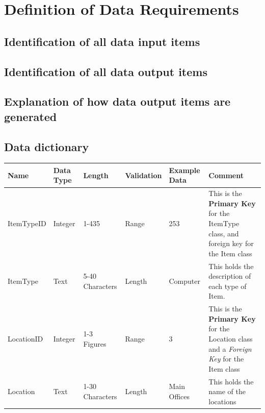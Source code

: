 \section{Definition of Data Requirements}

\subsection{Identification of all data input items}

\subsection{Identification of all data output items}

\subsection{Explanation of how data output items are generated}

\begin{landscape}

    \begin{center}
    \subsection{Data dictionary}
    \end{center}
    
    \begin{center}
        \begin{tabular}{|p{3cm}|p{2cm}|p{3cm}|p{2cm}|p{2cm}|p{5cm}|}
            \hline
            \textbf{Name} & \textbf{Data Type} & \textbf{Length} & \textbf{Validation} & \textbf{Example Data} & \textbf{Comment} \\ \hline
            ItemTypeID & Integer & 1-435           & Range  & 253           & This is the \textbf{Primary Key} for the ItemType class, and foreign key for the Item 
                                                                              class \\ \hline
            ItemType   & Text    & 5-40 Characters & Length & Computer      & This holds the description of each type of Item. \\ \hline
            LocationID & Integer & 1-3 Figures     & Range  & 3             & This is the \textbf{Primary Key} for the Location class and a \emph{Foreign Key} for the 
                                                                              Item class \\ \hline
            Location   & Text    & 1-30 Characters & Length & Main Offices  & This holds the name of the locations \\ \hline
            \end{tabular}
    \end{center}
\end{landscape}


